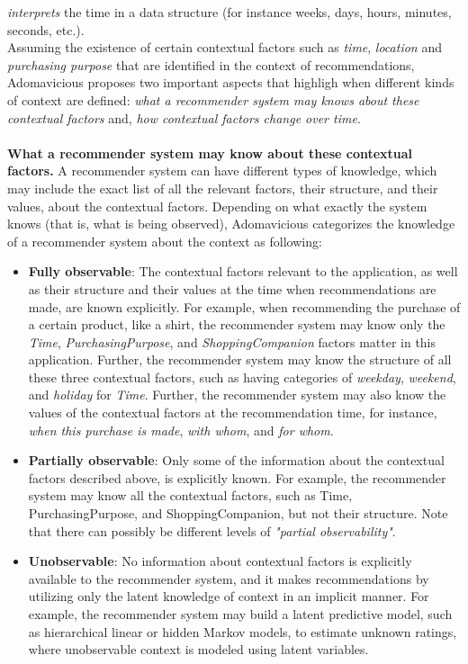 \textit{interprets} the time in a data structure (for instance weeks, 
days, hours, minutes, seconds, etc.). \\
Assuming the existence of certain contextual factors such as
\textit{time}, \textit{location} and \textit{purchasing purpose} that
are identified in the context of recommendations,
Adomavicious\cite{adomavicius2011context} proposes two important
aspects that highligh when different kinds of context are defined:
\textit{what a recommender system may knows about these contextual
factors} and, \textit{how contextual factors change over time}.\\ \\
\textbf{What a recommender system may know about these contextual
factors.}
A recommender system can have different types of knowledge, which may
include  the exact list of all the relevant factors, their structure,
and their values, about the contextual factors. Depending on what
exactly the system knows (that  is, what is being observed),
Adomavicious categorizes the knowledge of a recommender system about
the context as following:
	\begin{itemize}
	\item \textbf{Fully observable}: The contextual factors relevant to the 
	application, as well as their structure and their values at the time when 
	recommendations are made, are known explicitly. For example, when
	recommending the purchase of a certain product, like a shirt, the 
	recommender system may know only the \textit{Time}, \textit{PurchasingPurpose}, 
	and \textit{ShoppingCompanion} factors matter in this application. Further, 
	the recommender system may know the structure of all these three contextual 
	factors, such as having categories of \textit{weekday}, \textit{weekend}, 
	and \textit{holiday} for \textit{Time}. Further, the recommender system 
	may also know the values of the contextual factors at the recommendation 
	time, for instance, \textit{when this purchase is made}, 
	\textit{with whom}, and \textit{for whom}.
	\item \textbf{Partially observable}: Only some of the information about 
	the contextual factors described above, is explicitly known. For example, 
	the recommender system may know all the contextual factors, such as Time, 
	PurchasingPurpose, and ShoppingCompanion, but not their structure. Note that 
	there can possibly be different levels of \textit{"partial observability"}. 
	\item \textbf{Unobservable}: No information about contextual factors is 
	explicitly available to the recommender system, and it makes recommendations 
	by utilizing only the latent knowledge of context in an implicit manner. 
	For example, the recommender system may build a latent predictive model, 
	such as hierarchical linear or hidden Markov models, to estimate unknown 
	ratings, where unobservable context is modeled using latent variables.
	\end{itemize}
